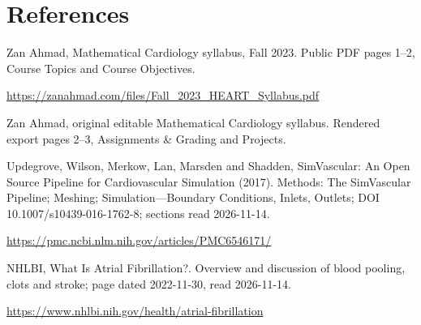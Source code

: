 \documentclass[11pt,letterpaper]{article}
\theoremstyle{definition}\newtheorem{definition}{Definition}\newtheorem{example}{Example}
\numberwithin{equation}{section}
\begin{document}
\section*{References}
\noindent\begin{minipage}{\linewidth}
Zan Ahmad, Mathematical Cardiology syllabus, Fall 2023. Public PDF pages 1--2, Course Topics and Course Objectives.

\url{https://zanahmad.com/files/Fall_2023_HEART_Syllabus.pdf}
\end{minipage}\par\medskip
\noindent\begin{minipage}{\linewidth}
Zan Ahmad, original editable Mathematical Cardiology syllabus. Rendered export pages 2--3, Assignments \& Grading and Projects.

\end{minipage}\par\medskip
\noindent\begin{minipage}{\linewidth}
Updegrove, Wilson, Merkow, Lan, Marsden and Shadden, SimVascular: An Open Source Pipeline for Cardiovascular Simulation (2017). Methods: The SimVascular Pipeline; Meshing; Simulation---Boundary Conditions, Inlets, Outlets; DOI 10.1007/s10439-016-1762-8; sections read 2026-11-14.

\url{https://pmc.ncbi.nlm.nih.gov/articles/PMC6546171/}
\end{minipage}\par\medskip
\noindent\begin{minipage}{\linewidth}
NHLBI, What Is Atrial Fibrillation?. Overview and discussion of blood pooling, clots and stroke; page dated 2022-11-30, read 2026-11-14.

\url{https://www.nhlbi.nih.gov/health/atrial-fibrillation}
\end{minipage}\par\medskip
\end{document}
